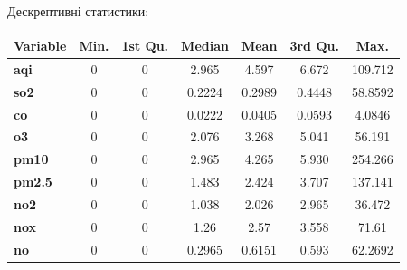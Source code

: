 \documentclass[./report.tex]{subfiles}
\begin{document}
\begin{enumerate}
  \pagebreak

  Дескрептивні статистики:

  \begin{tabular}{lcccccc}
    \hline
    \textbf{Variable} & \textbf{Min.} & \textbf{1st Qu.}  & \textbf{Median} & \textbf{Mean} & \textbf{3rd Qu.} & \textbf{Max.} \\
    \hline
    \textbf{aqi}      & 0             & 0                 & 2.965           & 4.597         & 6.672            & 109.712       \\
    \textbf{so2}      & 0             & 0                 & 0.2224          & 0.2989        & 0.4448           & 58.8592       \\
    \textbf{co}       & 0             & 0                 & 0.0222          & 0.0405        & 0.0593           & 4.0846        \\
    \textbf{o3}       & 0             & 0                 & 2.076           & 3.268         & 5.041            & 56.191        \\
    \textbf{pm10}     & 0             & 0                 & 2.965           & 4.265         & 5.930            & 254.266       \\
    \textbf{pm2.5}    & 0             & 0                 & 1.483           & 2.424         & 3.707            & 137.141       \\
    \textbf{no2}      & 0             & 0                 & 1.038           & 2.026         & 2.965            & 36.472        \\
    \textbf{nox}      & 0             & 0                 & 1.26            & 2.57          & 3.558            & 71.61         \\
    \textbf{no}       & 0             & 0                 & 0.2965          & 0.6151        & 0.593            & 62.2692       \\
  \end{tabular}


\end{enumerate}
\end{document}
